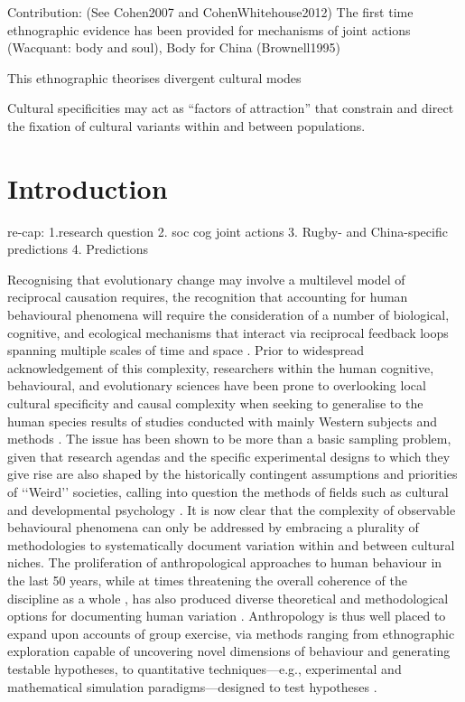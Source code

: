 Contribution: (See Cohen2007 and CohenWhitehouse2012)
The first time ethnographic evidence has been provided for mechanisms of joint actions
(Wacquant: body and soul), Body for China (Brownell1995)

This ethnographic theorises divergent cultural modes


Cultural specificities may act as ``factors of attraction'' \citep{Sperber2014} that constrain and direct the fixation of cultural variants within and between populations.





\section{Introduction}

re-cap:
1.research question
2. soc cog joint actions
3. Rugby-  and China-specific predictions
4. Predictions









Recognising that evolutionary change may involve a multilevel model of reciprocal causation requires, the recognition that accounting for human behavioural phenomena will require the consideration of a number of biological, cognitive, and ecological mechanisms that interact via reciprocal feedback loops spanning multiple scales of time and space \citep{Fuentes2015}.  Prior to widespread acknowledgement of this complexity, researchers within the human cognitive, behavioural, and evolutionary sciences have been prone to overlooking local cultural specificity and causal complexity when seeking to generalise to the human species results of studies conducted with mainly Western subjects and methods \citep{Henrich2010d}.  The issue has been shown to be more than a basic sampling problem, given that research agendas and the specific experimental designs to which they give rise are also shaped by the historically contingent assumptions and priorities of ‘‘Weird’’ societies, calling into question the methods of fields such as cultural and developmental psychology \citep{Whitehouse2012}.  It is now clear that the complexity of observable behavioural phenomena can only be addressed by embracing a plurality of methodologies to systematically document variation within and between cultural niches.  The proliferation of anthropological approaches to human behaviour in the last 50 years, while at times threatening the overall coherence of the discipline as a whole \citep{Beller2012}, has also produced diverse theoretical and methodological options for documenting human variation \citep{Fuentes2016a}.
Anthropology is thus well placed to expand upon accounts of group exercise, via methods ranging from ethnographic exploration capable of uncovering novel dimensions of behaviour and generating testable hypotheses, to quantitative techniques---e.g., experimental and mathematical simulation paradigms---designed to test hypotheses \citep{Epstein2006,Fuentes2016}.

